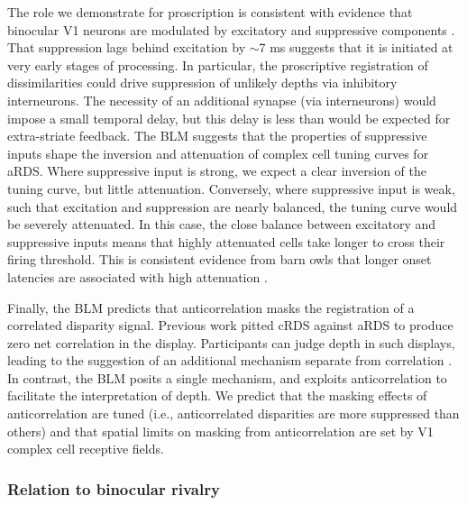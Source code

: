 The role we demonstrate for proscription is consistent with evidence that binocular V1 neurons are modulated by excitatory and suppressive components \cite{Tanabe:2011pt}. That suppression lags behind excitation by $\sim$7 ms \cite{Tanabe:2014ud} suggests that it is initiated at very early stages of processing. In particular, the proscriptive registration of dissimilarities could drive suppression of unlikely depths via inhibitory interneurons. The necessity of an additional synapse (via interneurons) would impose a small temporal delay, but this delay is less than would be expected for extra-striate feedback. The BLM suggests that the properties of suppressive inputs shape the inversion and attenuation of complex cell tuning curves for aRDS. Where suppressive input is strong, we expect a clear inversion of the tuning curve, but little attenuation. Conversely, where suppressive input is weak, such that excitation and suppression are nearly balanced, the tuning curve would be severely attenuated. In this case, the close balance between excitatory and suppressive inputs means that highly attenuated cells take longer to cross their firing threshold. This is consistent evidence from barn owls that longer onset latencies are associated with high attenuation \cite{Nieder:2001jl}. 

Finally, the BLM predicts that anticorrelation masks the registration of a correlated disparity signal. Previous work pitted cRDS against aRDS to produce zero net correlation in the display. Participants can judge depth in such displays, leading to the suggestion of an additional mechanism separate from correlation \cite{Doi:2011ku}. In contrast, the BLM posits a single mechanism, and exploits anticorrelation to facilitate the interpretation of depth. We predict that the masking effects of anticorrelation are tuned (i.e., anticorrelated disparities are more suppressed than others) and that spatial limits on masking from anticorrelation are set by V1 complex cell receptive fields.

\subsubsection*{Relation to binocular rivalry}

